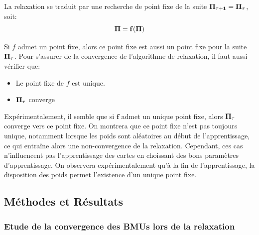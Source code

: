 La relaxation se traduit par une recherche de point fixe de la suite $\mathbf{\Pi_{\tau+1}} = \mathbf{\Pi_{\tau}}$, soit:
\begin{equation}
\mathbf{\Pi} = \mathbf{f}(\mathbf{\Pi})
\label{eq:suite}
\end{equation}

Si $f$ admet un point fixe, alors ce point fixe est aussi un point fixe pour la suite $\mathbf{\Pi}_\tau$. Pour s'assurer de la convergence de l'algorithme de relaxation, il faut aussi vérifier que:
\begin{itemize}
\item Le point fixe de $f$ est unique.
\item $\mathbf{\Pi_\tau}$ converge
\end{itemize}

Expérimentalement, il semble que si $\mathbf{f}$ admet un unique point fixe, alors $\mathbf{\Pi_\tau}$ converge vers ce point fixe. On montrera que ce point fixe n'est pas toujours unique, notamment lorsque les poids sont aléatoires au début de l'apprentissage, ce qui entraîne alors une non-convergence de la relaxation. Cependant, ces cas n'influencent pas l'apprentissage des cartes en choissant des bons paramètres d'apprentissage. On observera expérimentalement qu'à la fin de l'apprentissage, la disposition des poids permet l'existence d'un unique point fixe. 

\subsection{Méthodes et Résultats}

\subsubsection{Etude de la convergence des BMUs lors de la relaxation}

